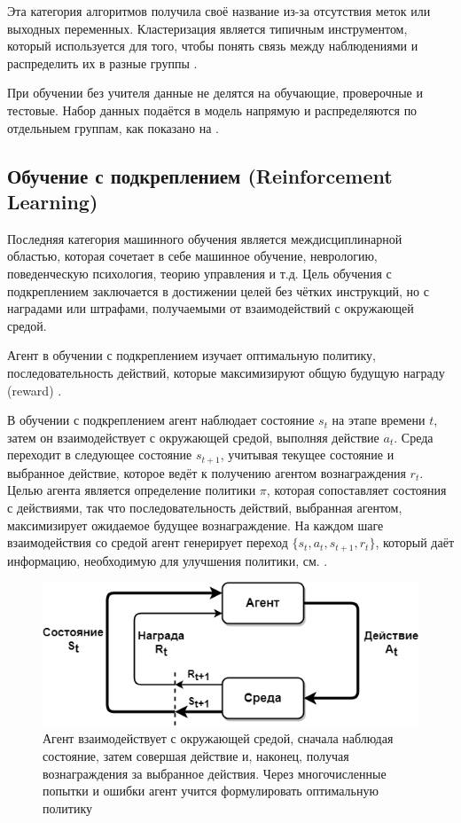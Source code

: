 Эта категория алгоритмов получила своё название из-за отсутствия меток или выходных переменных. Кластеризация является типичным инструментом, который используется для того, чтобы понять связь между наблюдениями и распределить их в разные группы \cite{hastie2001elements}.

При обучении без учителя данные не делятся на обучающие, проверочные и тестовые. Набор данных подаётся в модель напрямую и распределяются по отдельныем группам, как показано на .

\subsection{Обучение с подкреплением (Reinforcement Learning)}

Последняя категория машинного обучения является междисциплинарной областью, которая сочетает в себе машинное обучение, неврологию, поведенческую психология, теорию управления и т.д. Цель обучения с подкреплением заключается в достижении целей без чётких инструкций, но с наградами или штрафами, получаемыми от взаимодействий с окружающей средой.

Агент в обучении с подкреплением изучает оптимальную политику, последовательность действий, которые максимизируют общую будущую награду (reward) \cite{SuttonAndBarto-RL-Introduction-p2}.

В обучении с подкреплением агент наблюдает состояние ${s_t}$ на этапе времени ${t}$, затем он взаимодействует с окружающей средой, выполняя действие ${a_t}$. Среда переходит в следующее состояние ${s_{t+1}}$, учитывая текущее состояние и выбранное действие, которое ведёт к получению агентом вознаграждения ${r_t}$. Целью агента является определение политики $\pi$, которая сопоставляет состояния с действиями, так что последовательность действий, выбранная агентом, максимизирует ожидаемое будущее вознаграждение. На каждом шаге взаимодействия со средой агент генерирует переход ${\{s_t, a_t, s_{t+1}, r_t\}}$, который даёт информацию, необходимую для улучшения политики, см. .

\begin{figure}[ht!]
    \center
    \includegraphics [scale=0.60] {my_folder/images/ch1/rl-flow.png}
    \caption{Агент взаимодействует с окружающей средой, сначала наблюдая состояние, затем совершая действие и, наконец, получая вознаграждения за выбранное действия. Через многочисленные попытки и ошибки агент учится формулировать оптимальную политику \cite{SuttonAndBarto-RL-Introduction-p50}}
    \label{fig:ch1-RL-flow}
\end{figure}
